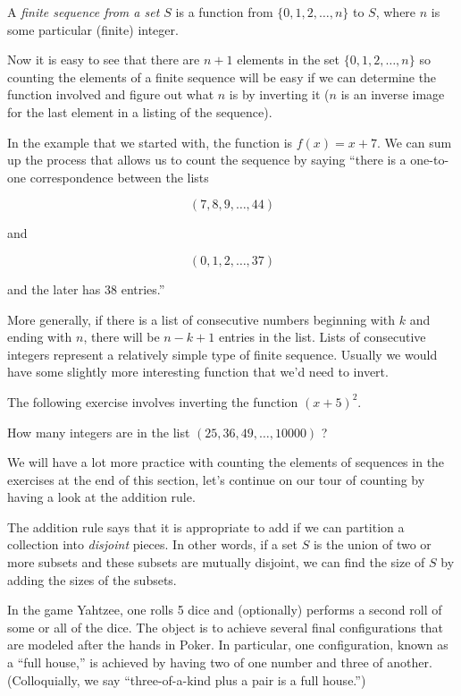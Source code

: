 \begin{defi}
A \emph{finite sequence from a set $S$} is a 
function from $\{0, 1, 2, \ldots , n\}$ to $S$, where $n$ is some 
particular (finite) integer.  
\end{defi}

Now it is easy to see that there are $n+1$ elements in the set
$\{0, 1, 2, \ldots , n \}$ so counting the elements of a finite
sequence will be easy if we can determine the function involved 
and figure out what $n$ is by inverting it ($n$ is an inverse image
for the last element in a listing of the sequence). 

In the example that we started with, the function is $f(x)=x+7$.  We
can sum up the process that allows us to count the sequence by saying
``there is a one-to-one correspondence between the lists %

\[ (7, 8, 9, \ldots , 44 ) \]

\noindent and

\[ (0, 1, 2, \ldots , 37 ) \]

\noindent and the later has $38$ entries.''

More generally, if there is a list of consecutive numbers beginning
with $k$ and ending with $n$, there will be $n-k+1$ entries in the 
list.  Lists of consecutive integers represent a relatively simple
type of finite sequence.  Usually we would have some slightly more
interesting function that we'd need to invert.

The following exercise involves inverting the function $(x+5)^2$.


\begin{exer}
How many integers are in the list $(25, 36, 49, \ldots , 10000)$ ?
\end{exer}

We will have a lot more practice with counting the elements of sequences
in the exercises at the end of this section, let's continue on our
tour of counting by having a look at the addition rule.  

The addition rule says that it is appropriate to add if we can 
partition a collection into \emph{disjoint} pieces.  In other words,
if a set $S$ is the union of two or more subsets and these subsets 
are mutually disjoint, we can find the size of $S$ by adding the sizes
of the subsets.

In the game Yahtzee, one rolls 5 dice and (optionally) performs a 
second roll of some or all of the dice.  The object is to achieve 
several final configurations that are modeled after the hands in
Poker.  In particular, one configuration, known as a ``full house,''
is achieved by having two of one number and three of another. 
(Colloquially, we say ``three-of-a-kind plus a pair is a full house.'')

